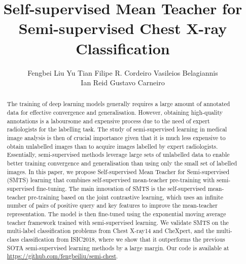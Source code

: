 \documentclass[runningheads]{llncs}
\newcommand\samethanks[1][\value{footnote}]{\footnotemark[#1]}
\begin{document}
\title{Self-supervised Mean Teacher for Semi-supervised Chest X-ray Classification }





\author{
Fengbei Liu  
Yu Tian\inst{1,4\samethanks}
Filipe R. Cordeiro 
Vasileios Belagiannis  \\
Ian Reid
Gustavo Carneiro
}



\maketitle              \vspace{-.3in}
\begin{abstract}

The training of deep learning models generally requires a large amount of annotated data for effective convergence and generalisation.
However, obtaining high-quality annotations is a laboursome and expensive process due to the need of expert radiologists for the labelling task.
The study of semi-supervised learning in medical image analysis is then of crucial importance given that it is much less expensive to obtain unlabelled images than to acquire images labelled by expert radiologists. Essentially, semi-supervised methods leverage large sets of unlabelled data to enable better training convergence and generalisation than using only the small set of labelled images. In this paper, we propose Self-supervised Mean Teacher for Semi-supervised (SMTS) learning that combines self-supervised mean-teacher pre-training with semi-supervised fine-tuning. The main innovation of SMTS is the self-supervised mean-teacher pre-training based on the joint contrastive learning, which uses an infinite number of pairs of positive query and key features to improve the mean-teacher representation. The model is then fine-tuned using the exponential moving average teacher framework trained with semi-supervised learning. We validate SMTS on the multi-label classification problems from Chest X-ray14 and CheXpert, and the multi-class classification from ISIC2018, where we show that it outperforms the previous SOTA semi-supervised learning methods by a large margin. Our code is available at \url{https://github.com/fengbeiliu/semi-chest}. 

\end{abstract}
\vspace{-.3in}
\end{document}
